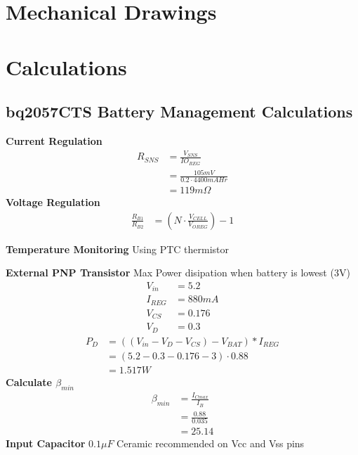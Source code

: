 \documentclass{article}
\numberwithin{figure}{section}
\numberwithin{equation}{section}
\begin{document}
{\begin{figure}[H]
	\caption{}
	\label{fig:bom2}
\end{figure}


\newpage
\section{Mechanical Drawings} \label{sect:appendixC}

\newpage
\section{Calculations} \label{sect:appendixD}
\subsection{bq2057CTS Battery Management Calculations} \label{sect:bqcalcs}
\textbf{Current Regulation}
\begin{align}
  \label{eq:currentreg}
  R_{SNS} &= \frac{V_{SNS}}{IO_{REG}} \\
  &= \frac{105mV}{0.2 \cdot 4400mAHr} \\
  &= 119m\Omega
\end{align}
\textbf{Voltage Regulation}
\begin{align}
  \label{eq:voltreg}
  \frac{R_{B1}}{R_{B2}} &= \left(N \cdot \frac{V_{CELL}}{V_{OREG}}\right) - 1
\end{align}

\textbf{Temperature Monitoring} \newline
Using PTC thermistor

\textbf{External PNP Transistor} \newline
Max Power disipation when battery is lowest (3V)
\begin{align*}
  V_{in} &= 5.2 \\
  I_{REG} &= 880mA \\
  V_{CS} &= 0.176 \\
  V_D &= 0.3
\end{align*}
\begin{align}
  \label{eq:diodepwr}
  P_D &= \left(\left(V_{in} - V_D - V_{CS}\right) - V_{BAT}\right) * I_{REG} \\
  &= \left(5.2 - 0.3 - 0.176 - 3\right) \cdot 0.88 \\
  &= 1.517 W
\end{align}
\textbf{Calculate $\beta_{min}$}
\begin{align}
  \label{eq:betamin}
  \beta_{min} &= \frac{I_{Cmax}}{I_{B}} \\
  &= \frac{0.88}{0.035} \\
  &= 25.14
\end{align}
\textbf{Input Capacitor} \newline
$0.1\mu F$ Ceramic recommended on Vcc and Vss pins

}
\end{document}

